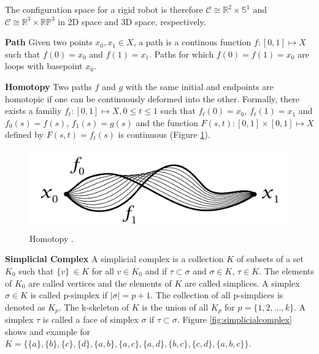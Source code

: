 \documentclass[]{article}
\begin{document}
The configuration space for a rigid robot is therefore
\(\mathcal{C} \cong \mathbb{R}^{2} \times \mathbb{S}^{1}\) and
\(\mathcal{C} \cong \mathbb{R}^{3} \times \mathbb{RP}^{3}\) in 2D
space and 3D space, respectively.

\textbf{Path} Given two points \(x_{0}, x_{1} \in X\), a path is a
continous function \(f: [0, 1] \mapsto X\) such that \(f(0) = x_{0}\)
and \(f(1) = x_{1}\). Paths for which \(f(0) = f(1) = x_{0}\) are
loops with basepoint \(x_{0}\).

\textbf{Homotopy} Two paths \(f\) and \(g\) with the same initial and endpoints
are homotopic if one can be continuously deformed into the
other. Formally, there exists a familiy
\(f_{t}: [0, 1] \mapsto X, 0 \le t \le 1\) such that
\(f_{t}(0) = x_{0}\), \(f_{t}(1) = x_{1}\) and \(f_{0}(s) = f(s)\),
\(f_{1}(s) = g(s)\) and the function
\(F(s, t): [0, 1] \times [0, 1] \mapsto X\) defined by
\(F(s, t) = f_{t}(s)\) is continuous (Figure \ref{fig:homotopy}).

\begin{figure}[h] \centering \includegraphics[scale=.18]{homotopy}
  \caption{Homotopy \cite{hatcherAlgebraicTopology2002}.}
  \label{fig:homotopy}
\end{figure}

\textbf{Simplicial Complex} A simplicial complex is a collection \(K\) of
subsets of a set \(K_{0}\) such that \(\{v\}\ \in K\) for all \(v \in
K_{0}\) and if \(\tau \subset \sigma\) and \(\sigma \in K\), \(\tau
\in K\). The elements of \(K_{0}\) are called vertices and the
elements of \(K\) are called simplices. A simplex \(\sigma \in K\) is
called p-simplex if \(|\sigma| = p + 1\). The collection of all
p-simplices is denoted as \(K_{p}\). The k-skeleton of \(K\) is the
union of all \(K_{p}\) for \(p = \{1, 2, ..., k\}\). A simplex \(\tau\)
is called a face of simplex \(\sigma\) if \(\tau \subset
\sigma\). Figure \ref{fig:simplicialcomplex} shows and example for \(K = \{\{a\}, \{b\}, \{c\}, \{d\}, \{a,
    b\}, \{a, c\}, \{a, d\}, \{b, c\}, \{c, d\}, \{a, b, c\}\}\).
\end{document}
